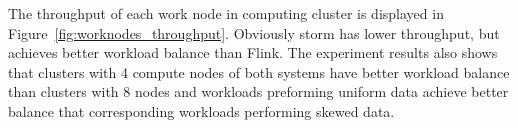 The throughput of each work node in computing cluster is displayed in Figure~\ref{fig:worknodes_throughput}. Obviously storm has lower throughput, but achieves better workload balance than Flink. The experiment results also shows that clusters with 4 compute nodes of both systems have better workload balance than clusters with 8 nodes and workloads preforming uniform data achieve better balance that corresponding workloads performing skewed data.


\begin{figure}[t!]
  \begin{center}
  ~

\end{center}
\end{figure}
